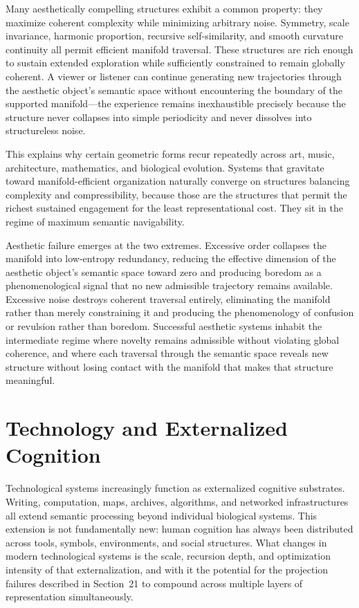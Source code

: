 \documentclass[11pt,a4paper,twocolumn]{article}
\begin{document}
Many aesthetically compelling structures exhibit a common
property: they maximize coherent complexity while minimizing
arbitrary noise. Symmetry, scale invariance, harmonic
proportion, recursive self-similarity, and smooth curvature
continuity all permit efficient manifold traversal. These
structures are rich enough to sustain extended exploration
while sufficiently constrained to remain globally coherent.
A viewer or listener can continue generating new trajectories
through the aesthetic object's semantic space without
encountering the boundary of the supported manifold---the
experience remains inexhaustible precisely because the
structure never collapses into simple periodicity and
never dissolves into structureless noise.

This explains why certain geometric forms recur repeatedly
across art, music, architecture, mathematics, and biological
evolution. Systems that gravitate toward manifold-efficient
organization naturally converge on structures balancing
complexity and compressibility, because those are the
structures that permit the richest sustained engagement
for the least representational cost. They sit in the regime
of maximum semantic navigability.

Aesthetic failure emerges at the two extremes. Excessive
order collapses the manifold into low-entropy redundancy,
reducing the effective dimension of the aesthetic object's
semantic space toward zero and producing boredom as a
phenomenological signal that no new admissible trajectory
remains available. Excessive noise destroys coherent
traversal entirely, eliminating the manifold rather than
merely constraining it and producing the phenomenology of
confusion or revulsion rather than boredom. Successful
aesthetic systems inhabit the intermediate regime where
novelty remains admissible without violating global
coherence, and where each traversal through the semantic
space reveals new structure without losing contact with
the manifold that makes that structure meaningful.


\section{Technology and Externalized Cognition}

Technological systems increasingly function as externalized
cognitive substrates. Writing, computation, maps, archives,
algorithms, and networked infrastructures all extend
semantic processing beyond individual biological systems.
This extension is not fundamentally new: human cognition
has always been distributed across tools, symbols,
environments, and social structures. What changes in
modern technological systems is the scale, recursion depth,
and optimization intensity of that externalization, and
with it the potential for the projection failures described
in Section~21 to compound across multiple layers of
representation simultaneously.
\end{document}
